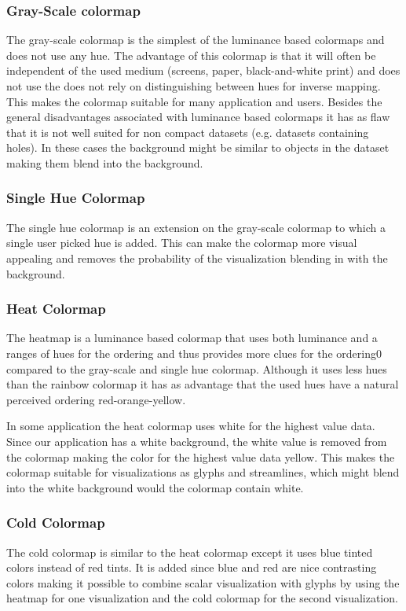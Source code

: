 \subsubsection{Gray-Scale colormap} %
\label{ssub:gray_scale_colormap}
The gray-scale colormap is the simplest of the luminance based colormaps and does not use any hue. The advantage of this colormap is that it will often be independent of the used medium (screens, paper, black-and-white print) and does not use the does not rely on distinguishing between hues for inverse mapping. This makes the colormap suitable for many application and users. Besides the general disadvantages associated with luminance based colormaps it has as flaw that it is not well suited for non compact datasets (e.g. datasets containing holes). In these cases the background might be similar to objects in the dataset making them blend into the background.


\subsubsection{Single Hue Colormap} %
\label{ssub:single_hue_colormap}
The single hue colormap is an extension on the gray-scale colormap to which a single user picked hue is added. This can make the colormap more visual appealing and removes the probability of the visualization blending in with the background.

\subsubsection{Heat Colormap} %
\label{sub:heat__colormap}
The heatmap is a luminance based colormap that uses both luminance and a ranges of hues for the ordering and thus provides more clues for the ordering0 compared to the gray-scale and single hue colormap. Although it uses less hues than the rainbow colormap it has as advantage that the used hues have a natural perceived ordering red-orange-yellow.

In some application the heat colormap uses white for the highest value data. Since our application has a white background, the white value is removed from the colormap making the color for the highest value data yellow. This makes the colormap suitable for visualizations as glyphs and streamlines, which might blend into the white background would the colormap contain white.


\subsubsection{Cold Colormap} %
\label{ssub:cold_colormap}
The cold colormap is similar to the heat colormap except it uses blue tinted colors instead of red tints. It is added since blue and red are nice contrasting colors making it possible to combine scalar visualization with glyphs by using the heatmap for one visualization and the cold colormap for the second visualization.

